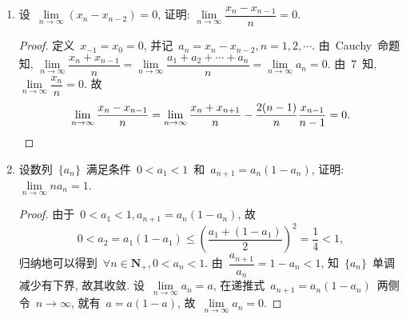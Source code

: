 \documentclass[UTF8,a4paper,10pt,twoside]{book}
\begin{document}
\begin{enumerate}
	\item 设~$\lim\limits_{n\to\infty} (x_n-x_{n-2})=0$, 证明: $\lim\limits_{n\to\infty} \dfrac{x_n-x_{n-1}}{n}=0$.
	      \begin{proof}
		      定义~$x_{-1}=x_0=0$, 并记~$a_n=x_n-x_{n-2}, n=1,2,\cdots$. 由~Cauchy~命题知, $\lim\limits_{n\to\infty} \dfrac{x_n+x_{n-1}}{n}=\lim\limits_{n\to\infty} \dfrac{a_1+a_2+\cdots+a_n}{n}=\lim\limits_{n\to\infty} a_n=0$. 由~7~知, $\lim\limits_{n\to\infty} \dfrac{x_n}{n}=0$. 故
		      \[
			      \lim\limits_{n\to\infty} \dfrac{x_n-x_{n-1}}{n}=\lim\limits_{n\to\infty} \dfrac{x_n+x_{n+1}}{n}-\dfrac{2(n-1)}{n}\dfrac{x_{n-1}}{n-1}=0.\qedhere
		      \]
	      \end{proof}
	\item 设数列~$\{a_n\}$~满足条件~$0<a_1<1$~和~$a_{n+1}=a_n(1-a_n)$, 证明: $\lim\limits_{n\to\infty} na_n=1$.
	      \begin{proof}
		      由于~$0<a_1<1, a_{n+1}=a_n(1-a_n)$, 故
		      \[
			      0<a_2=a_1(1-a_1)\leqslant\left(\dfrac{a_1+(1-a_1)}{2}\right)^2=\dfrac{1}{4}<1,
		      \]
		      归纳地可以得到~$\forall n\in\mathbf{N}_{+}, 0<a_n<1$. 由~$\dfrac{a_{n+1}}{a_n}=1-a_n<1$, 知~$\{a_n\}$~单调减少有下界, 故其收敛. 设~$\lim\limits_{n\to\infty} a_n=a$, 在递推式~$a_{n+1}=a_n(1-a_n)$~两侧令~$n\to\infty$, 就有~$a=a(1-a)$, 故~$\lim\limits_{n\to\infty} a_n=0$.


\end{proof}
\end{enumerate}
\end{document}
